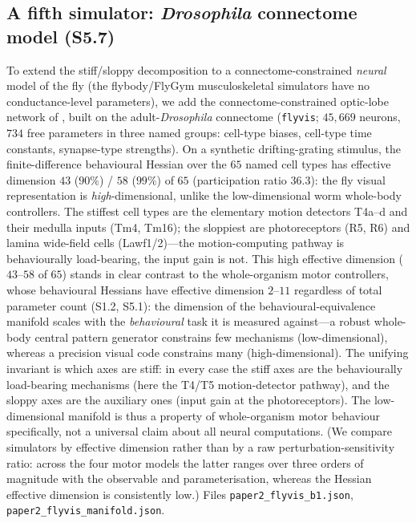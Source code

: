 \documentclass[11pt]{article}
\begin{document}
\subsection{A fifth simulator: \emph{Drosophila} connectome model (S5.7)}
To extend the stiff/sloppy decomposition to a connectome-constrained \emph{neural} model of the fly (the flybody/FlyGym musculoskeletal simulators have no conductance-level parameters), we add the connectome-constrained optic-lobe network of \citet{lappalainen2024connectome}, built on the adult-\emph{Drosophila} connectome \citep{scheffer2020connectome,dorkenwald2024flywire} (\texttt{flyvis}; $45{,}669$ neurons, $734$ free parameters in three named groups: cell-type biases, cell-type time constants, synapse-type strengths). On a synthetic drifting-grating stimulus, the finite-difference behavioural Hessian over the $65$ named cell types has effective dimension $43$ ($90\%$) / $58$ ($99\%$) of $65$ (participation ratio $36.3$): the fly visual representation is \emph{high}-dimensional, unlike the low-dimensional worm whole-body controllers. The stiffest cell types are the elementary motion detectors T4a--d and their medulla inputs (Tm4, Tm16); the sloppiest are photoreceptors (R5, R6) and lamina wide-field cells (Lawf1/2)---the motion-computing pathway is behaviourally load-bearing, the input gain is not. This high effective dimension ($43$--$58$ of $65$) stands in clear contrast to the whole-organism motor controllers, whose behavioural Hessians have effective dimension $2$--$11$ regardless of total parameter count (S1.2, S5.1): the dimension of the behavioural-equivalence manifold scales with the \emph{behavioural} task it is measured against---a robust whole-body central pattern generator constrains few mechanisms (low-dimensional), whereas a precision visual code constrains many (high-dimensional). The unifying invariant is which axes are stiff: in every case the stiff axes are the behaviourally load-bearing mechanisms (here the T4/T5 motion-detector pathway), and the sloppy axes are the auxiliary ones (input gain at the photoreceptors). The low-dimensional manifold is thus a property of whole-organism motor behaviour specifically, not a universal claim about all neural computations. (We compare simulators by effective dimension rather than by a raw perturbation-sensitivity ratio: across the four motor models the latter ranges over three orders of magnitude with the observable and parameterisation, whereas the Hessian effective dimension is consistently low.) Files \texttt{paper2\_flyvis\_b1.json}, \texttt{paper2\_flyvis\_manifold.json}.
\end{document}
